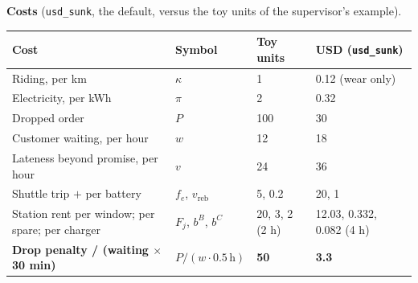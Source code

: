 \noindent\textbf{Costs} (\texttt{usd\_sunk}, the default, versus the toy units of the supervisor's example).
\begin{center}\small
\begin{tabular}{@{}L{4.9cm}L{2.8cm}L{3.2cm}L{3.9cm}@{}}
\toprule
Cost & Symbol & Toy units & USD (\texttt{usd\_sunk}) \\
\midrule
Riding, per km & $\kappa$ & 1 & 0.12 (wear only) \\
Electricity, per kWh & $\pi$ & 2 & 0.32 \\
Dropped order & $P$ & 100 & 30 \\
Customer waiting, per hour & $w$ & 12 & 18 \\
Lateness beyond promise, per hour & $v$ & 24 & 36 \\
Shuttle trip $+$ per battery & $f_e$, $v_{\mathrm{reb}}$ & 5, 0.2 & 20, 1 \\
Station rent per window; per spare; per charger & $F_j$, $b^B$, $b^C$ & 20, 3, 2 (2 h) & 12.03, 0.332, 0.082 (4 h) \\
\textbf{Drop penalty / (waiting $\times$ 30 min)} & $P/(w\cdot 0.5\,\mathrm{h})$ & \textbf{50} & \textbf{3.3} \\
\bottomrule
\end{tabular}
\end{center}


